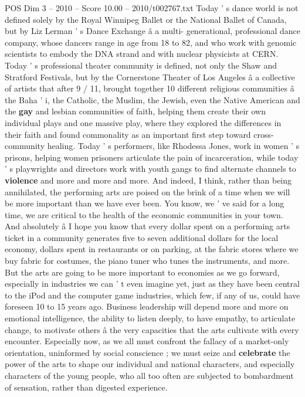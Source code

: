 \begin{textsample}{POS Dim 3 – 2010 – Score 10.00 – 2010/t002767.txt}
Today ' s dance world is not defined solely by the Royal Winnipeg Ballet or the National Ballet of Canada, but by Liz Lerman ' s Dance Exchange â a multi- generational, professional dance company, whose dancers range in age from 18 to 82, and who work with genomic scientists to embody the DNA strand and with nuclear physicists at CERN.
Today ' s professional theater community is defined, not only the Shaw and Stratford Festivals, but by the Cornerstone Theater of Los Angeles â a collective of artists that after 9 / 11, brought together 10 different religious communities â the Baha ' i, the Catholic, the Muslim, the Jewish, even the Native American and the \textbf{gay} and lesbian communities of faith, helping them create their own individual plays and one massive play, where they explored the differences in their faith and found commonality as an important first step toward cross-community healing.
Today ' s performers, like Rhodessa Jones, work in women ' s prisons, helping women prisoners articulate the pain of incarceration, while today ' s playwrights and directors work with youth gangs to find alternate channels to \textbf{violence} and more and more and more.
And indeed, I think, rather than being annihilated, the performing arts are poised on the brink of a time when we will be more important than we have ever been.
You know, we ' ve said for a long time, we are critical to the health of the economic communities in your town.
And absolutely â I hope you know that every dollar spent on a performing arts ticket in a community generates five to seven additional dollars for the local economy, dollars spent in restaurants or on parking, at the fabric stores where we buy fabric for costumes, the piano tuner who tunes the instruments, and more.
But the arts are going to be more important to economies as we go forward, especially in industries we can ' t even imagine yet, just as they have been central to the iPod and the computer game industries, which few, if any of us, could have foreseen 10 to 15 years ago.
Business leadership will depend more and more on emotional intelligence, the ability to listen deeply, to have empathy, to articulate change, to motivate others â the very capacities that the arts cultivate with every encounter.
Especially now, as we all must confront the fallacy of a market-only orientation, uninformed by social conscience ; we must seize and \textbf{celebrate} the power of the arts to shape our individual and national characters, and especially characters of the young people, who all too often are subjected to bombardment of sensation, rather than digested experience.

\end{textsample}
